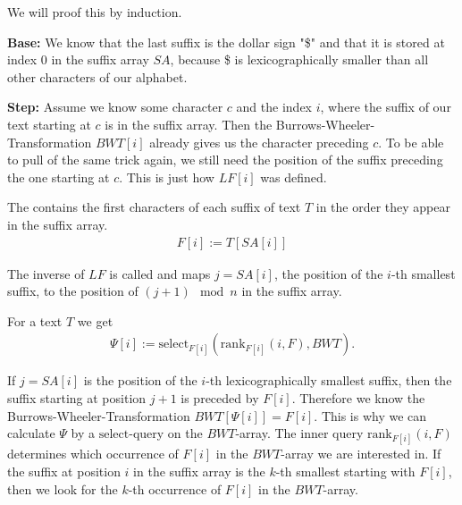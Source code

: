 \begin{Proof}
  We will proof this by induction.

  \textbf{Base:} We know that the last suffix is the dollar sign "\$" and that it is stored at index $0$ in the suffix array $SA$, because \$ is lexicographically smaller than all other characters of our alphabet.

  \textbf{Step:} Assume we know some character $c$ and the index $i$, where the suffix of our text starting at $c$ is in the suffix array. Then the Burrows-Wheeler-Transformation $BWT[i]$ already gives us the character preceding $c$. To be able to pull of the same trick again, we still need the position of the suffix preceding the one starting at $c$. This is just how $LF[i]$ was defined.
\end{Proof}

\begin{Definition}
  The  contains the first characters of each suffix of text $T$ in the order they appear in the suffix array.
  \begin{align}
    F[i] := T[SA[i]]
  \end{align}
\end{Definition}

\begin{Definition}
  The inverse of $LF$ is called  and maps $j = SA[i]$, the position of the $i$-th smallest suffix, to the position of $(j+1) \mod n$ in the suffix array.
\end{Definition}

\begin{Theorem}
  For a text $T$ we get
  \begin{align}
    \Psi[i] := \mathrm{select}_{F[i]}(\mathrm{rank}_{F[i]}(i, F), BWT)
    \text{.}
  \end{align}
\end{Theorem}

\begin{Proof}
  If $j = SA[i]$ is the position of the $i$-th lexicographically smallest suffix, then the suffix starting at position $j+1$ is preceded by $F[i]$. Therefore we know the Burrows-Wheeler-Transformation $BWT[\Psi[i]] = F[i]$. This is why we can calculate $\Psi$ by a $\mathrm{select}$-query on the $BWT$-array. The inner query $\mathrm{rank}_{F[i]}(i, F)$ determines which occurrence of $F[i]$ in the $BWT$-array we are interested in. If the suffix at position $i$ in the suffix array is the $k$-th smallest starting with $F[i]$, then we look for the $k$-th occurrence of $F[i]$ in the $BWT$-array.
\end{Proof}


